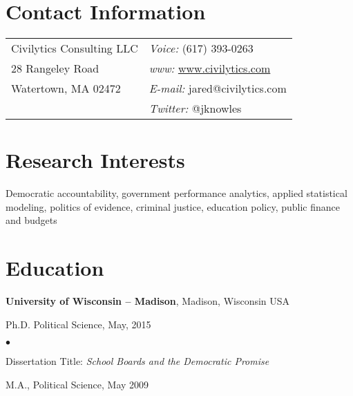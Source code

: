 \documentclass[margin,line]{res}
\newenvironment{list1}{
  \begin{list}{\ding{113}}{%
      \setlength{\itemsep}{0in}
      \setlength{\parsep}{0in} \setlength{\parskip}{0in}
      \setlength{\topsep}{0in} \setlength{\partopsep}{0in} 
      \setlength{\leftmargin}{0.17in}}}{\end{list}}
\newenvironment{list2}{
  \begin{list}{$\bullet$}{%
      \setlength{\itemsep}{0in}
      \setlength{\parsep}{0in} \setlength{\parskip}{0in}
      \setlength{\topsep}{0in} \setlength{\partopsep}{0in} 
      \setlength{\leftmargin}{0.2in}}}{\end{list}}
\begin{document}

\begin{resume}
\section{\sc Contact Information}
\vspace{.05in}
\begin{tabular}{@{}p{2.75in}p{2.75in}}
Civilytics Consulting LLC & {\it Voice:}  (617) 393-0263 \\            
28 Rangeley Road & {\it www:} \url{www.civilytics.com} \\           
Watertown, MA 02472 & {\it E-mail:}  jared@civilytics.com\\       
 & {\it Twitter:} @jknowles      \\   
\end{tabular}

\section{\sc Research Interests}
Democratic accountability, government performance analytics, applied statistical 
modeling, politics of evidence, criminal justice, education policy, public finance and budgets

\section{\sc Education}
{\bf University of Wisconsin -- Madison}, Madison, Wisconsin USA\\
\vspace*{-.1in}
\begin{list1}
\item[] Ph.D. Political Science, May, 2015
\begin{list2}
\vspace*{.05in}
\item Dissertation Title: \emph {School Boards and the Democratic Promise} 
\end{list2}
\vspace*{.05in}
\item[] M.A., Political Science,  May 2009
\end{list1}


\end{resume}
\end{document}

